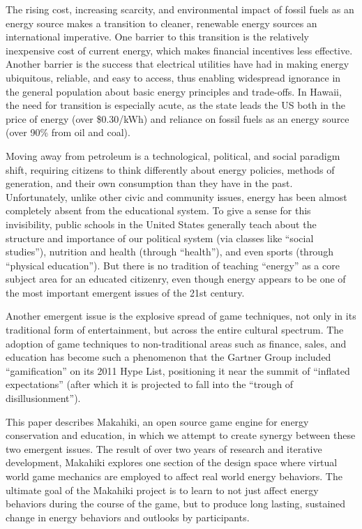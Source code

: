 \documentclass{acm_proc_article-sp}
\begin{document}
The rising cost, increasing scarcity, and environmental impact of fossil fuels
as an energy source makes a transition to cleaner, renewable energy sources an
international imperative.  One barrier to this transition is the relatively
inexpensive cost of current energy, which makes financial incentives less
effective. Another barrier is the success that electrical utilities have had in
making energy ubiquitous, reliable, and easy to access, thus enabling
widespread ignorance in the general population about basic energy principles
and trade-offs.  In Hawaii, the need for transition is especially acute, as the
state leads the US both in the price of energy (over \$0.30/kWh) and
reliance on fossil fuels as an energy source (over 90\% from oil and coal).

Moving away from petroleum is a technological, political, and social paradigm
shift, requiring citizens to think differently about energy policies, methods
of generation, and their own consumption than they have in the past.
Unfortunately, unlike other civic and community issues, energy has been almost
completely absent from the educational system. To give a sense for this
invisibility, public schools in the United States generally teach about the
structure and importance of our political system (via classes like ``social
studies''), nutrition and health (through ``health''), and even sports (through
``physical education'').  But there is no tradition of teaching ``energy'' as a
core subject area for an educated citizenry, even though energy appears to be
one of the most important emergent issues of the 21st century.

Another emergent issue is the explosive spread of game techniques, not only in
its traditional form of entertainment, but across the entire cultural spectrum.
The adoption of game techniques to non-traditional areas such as finance,
sales, and education has become such a phenomenon that the Gartner Group
included ``gamification'' \cite{Deterding2011mt} on its 2011 Hype List,
positioning it near the summit of ``inflated expectations'' (after which it is
projected to fall into the ``trough of disillusionment'').

This paper describes Makahiki, an open source game engine for energy
conservation and education, in which we attempt to create synergy between
these two emergent issues.  The result of over two years of research and
iterative development, Makahiki explores one section of the design space
where virtual world game mechanics are employed to affect real world energy
behaviors.  The ultimate goal of the Makahiki project is to learn to
not just affect energy behaviors during the course of the game, but to
produce long lasting, sustained change in energy behaviors and
outlooks by participants. 
\end{document}
